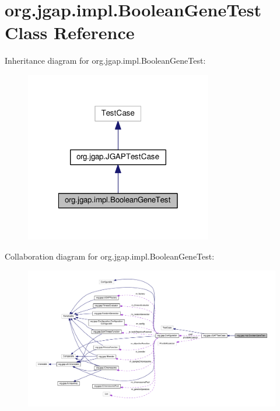 \hypertarget{classorg_1_1jgap_1_1impl_1_1_boolean_gene_test}{\section{org.\-jgap.\-impl.\-Boolean\-Gene\-Test Class Reference}
\label{classorg_1_1jgap_1_1impl_1_1_boolean_gene_test}
}


Inheritance diagram for org.\-jgap.\-impl.\-Boolean\-Gene\-Test\-:
\nopagebreak
\begin{figure}[H]
\begin{center}
\leavevmode
\includegraphics[width=232pt]{classorg_1_1jgap_1_1impl_1_1_boolean_gene_test__inherit__graph}
\end{center}
\end{figure}


Collaboration diagram for org.\-jgap.\-impl.\-Boolean\-Gene\-Test\-:
\nopagebreak
\begin{figure}[H]
\begin{center}
\leavevmode
\includegraphics[width=350pt]{classorg_1_1jgap_1_1impl_1_1_boolean_gene_test__coll__graph}
\end{center}
\end{figure}
